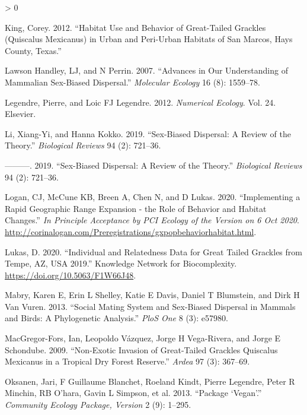 \documentclass[
]{article}
\newlength{\cslhangindent}
\newenvironment{CSLReferences}[2] %
 {%
  \setlength{\parindent}{0pt}
  \ifodd #1 \everypar{\setlength{\hangindent}{\cslhangindent}}\ignorespaces\fi
  \ifnum #2 > 0
  \setlength{\parskip}{#2\baselineskip}
  \fi
 }%
 {}
\begin{document}
\begin{CSLReferences}{1}{0}
\leavevmode\hypertarget{ref-king2012habitat}{}%
King, Corey. 2012. {``Habitat Use and Behavior of Great-Tailed Grackles
(Quiscalus Mexicanus) in Urban and Peri-Urban Habitats of San Marcos,
Hays County, Texas.''}

\leavevmode\hypertarget{ref-lawson2007advances}{}%
Lawson Handley, LJ, and N Perrin. 2007. {``Advances in Our Understanding
of Mammalian Sex-Biased Dispersal.''} \emph{Molecular Ecology} 16 (8):
1559--78.

\leavevmode\hypertarget{ref-legendre2012numerical}{}%
Legendre, Pierre, and Loic FJ Legendre. 2012. \emph{Numerical Ecology}.
Vol. 24. Elsevier.

\leavevmode\hypertarget{ref-li2019sex}{}%
Li, Xiang-Yi, and Hanna Kokko. 2019. {``Sex-Biased Dispersal: A Review
of the Theory.''} \emph{Biological Reviews} 94 (2): 721--36.

\leavevmode\hypertarget{ref-li2019sex}{}%
---------. 2019. {``Sex-Biased Dispersal: A Review of the Theory.''}
\emph{Biological Reviews} 94 (2): 721--36.

\leavevmode\hypertarget{ref-logan2020xpop}{}%
Logan, CJ, McCune KB, Breen A, Chen N, and D Lukas. 2020.
{``Implementing a Rapid Geographic Range Expansion - the Role of
Behavior and Habitat Changes.''} \emph{In Principle Acceptance by PCI
Ecology of the Version on 6 Oct 2020}.
\url{http://corinalogan.com/Preregistrations/gxpopbehaviorhabitat.html}.

\leavevmode\hypertarget{ref-lukas2020geneticdata}{}%
Lukas, D. 2020. {``Individual and Relatedness Data for Great Tailed
Grackles from Tempe, AZ, USA 2019.''} Knowledge Network for
Biocomplexity. \url{https://doi.org/10.5063/F1W66J48}.

\leavevmode\hypertarget{ref-mabry2013social}{}%
Mabry, Karen E, Erin L Shelley, Katie E Davis, Daniel T Blumstein, and
Dirk H Van Vuren. 2013. {``Social Mating System and Sex-Biased Dispersal
in Mammals and Birds: A Phylogenetic Analysis.''} \emph{PloS One} 8 (3):
e57980.

\leavevmode\hypertarget{ref-macgregor2009non}{}%
MacGregor-Fors, Ian, Leopoldo Vázquez, Jorge H Vega-Rivera, and Jorge E
Schondube. 2009. {``Non-Exotic Invasion of Great-Tailed Grackles
Quiscalus Mexicanus in a Tropical Dry Forest Reserve.''} \emph{Ardea} 97
(3): 367--69.

\leavevmode\hypertarget{ref-oksanen2013package}{}%
Oksanen, Jari, F Guillaume Blanchet, Roeland Kindt, Pierre Legendre,
Peter R Minchin, RB O'hara, Gavin L Simpson, et al. 2013. {``Package
{`Vegan'}.''} \emph{Community Ecology Package, Version} 2 (9): 1--295.


\end{CSLReferences}
\end{document}
